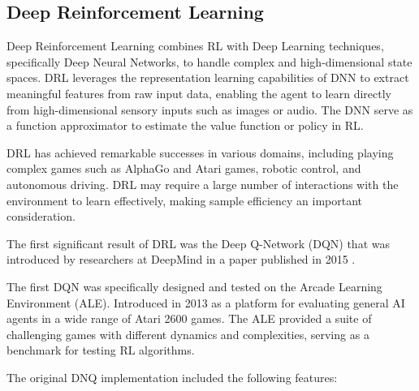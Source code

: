 \subsection{Deep Reinforcement Learning}
\begin{textblock}
Deep Reinforcement Learning combines RL with Deep Learning techniques, specifically Deep Neural Networks, to handle complex and high-dimensional state spaces. DRL leverages the representation learning capabilities of DNN to extract meaningful features from raw input data, enabling the agent to learn directly from high-dimensional sensory inputs such as images or audio. The DNN serve as a function approximator to estimate the value function or policy in RL. 

DRL has achieved remarkable successes in various domains, including playing complex games such as AlphaGo\cite{alphago2016} and Atari games\cite{mnih2015}, robotic control\cite{lillicrap2015}, and autonomous driving\cite{bojarski2016}. DRL may require a large number of interactions with the environment to learn effectively, making sample efficiency an important consideration.\cite{horgan2018}\cite{fortunato2017}\cite{mankowitz2019}

The first significant result of DRL was the Deep Q-Network (DQN) that was introduced by researchers at DeepMind in a paper published in 2015 \cite{mnih2015}.

The first DQN was specifically designed and tested on the Arcade Learning Environment (ALE). Introduced in 2013 as a platform for evaluating general AI agents in a wide range of Atari 2600 games. The ALE provided a suite of challenging games with different dynamics and complexities, serving as a benchmark for testing RL algorithms.

The original DNQ implementation included the following features:
\end{textblock}

